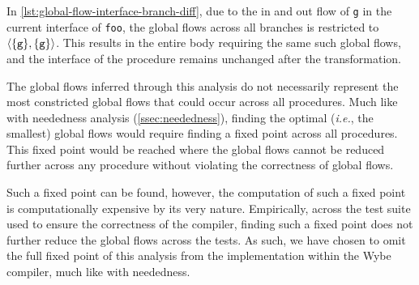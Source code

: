 In \cref{lst:global-flow-interface-branch-diff}, due to the in and out flow of \texttt{g} in the current interface of \texttt{foo}, the global flows across all branches is restricted to $\angles*{\set{\texttt{g}}, \set{\texttt{g}}}$. This results in the entire body requiring the same such global flows, and the interface of the procedure remains unchanged after the transformation.

The global flows inferred through this analysis do not necessarily represent the most constricted global flows that could occur across all procedures. Much like with neededness analysis (\cref{ssec:neededness}), finding the optimal (\textit{i.e.}, the smallest) global flows would require finding a fixed point across all procedures. This fixed point would be reached where the global flows cannot be reduced further across any procedure without violating the correctness of global flows. 

Such a fixed point can be found, however, the computation of such a fixed point is computationally expensive by its very nature. Empirically, across the test suite used to ensure the correctness of the compiler, finding such a fixed point does not further reduce the global flows across the tests. As such, we have chosen to omit the full fixed point of this analysis from the implementation within the Wybe compiler, much like with neededness.

